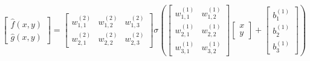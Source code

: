 \documentclass[preview]{standalone}
\begin{document}
\begin{align*}
\begin{bmatrix} \hat{f}(x,y) \\ \hat{g}(x,y) \end{bmatrix} = \begin{bmatrix} w_{1,1}^{(2)} & w_{1,2}^{(2)} & w_{1,3}^{(2)} \\ w_{2,1}^{(2)} & w_{2,2}^{(2)} & w_{2,3}^{(2)} \end{bmatrix} \sigma\left(\begin{bmatrix} w_{1,1}^{(1)} & w_{1,2}^{(1)} \\ w_{2,1}^{(1)} & w_{2,2}^{(1)} \\ w_{3,1}^{(1)} & w_{3,2}^{(1)} \end{bmatrix} \begin{bmatrix} x \\ y \end{bmatrix} + \begin{bmatrix} b_1^{(1)} \\ b_2^{(1)} \\ b_3^{(1)}\end{bmatrix}\right)
\end{align*}
\end{document}
